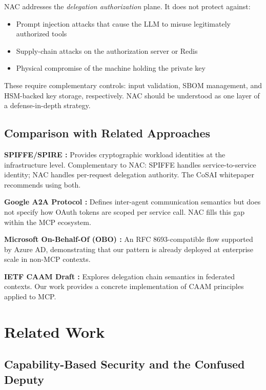 \documentclass[journal]{IEEEtran}
\begin{document}
NAC addresses the \textit{delegation authorization} plane. It does not protect against:
\begin{itemize}
  \item Prompt injection attacks that cause the LLM to misuse legitimately authorized tools
  \item Supply-chain attacks on the authorization server or Redis
  \item Physical compromise of the machine holding the private key
\end{itemize}

These require complementary controls: input validation, SBOM management, and HSM-backed key storage, respectively. NAC should be understood as one layer of a defense-in-depth strategy.

\subsection{Comparison with Related Approaches}

\textbf{SPIFFE/SPIRE \cite{spiffe}:} Provides cryptographic workload identities at the infrastructure level. Complementary to NAC: SPIFFE handles service-to-service identity; NAC handles per-request delegation authority. The CoSAI whitepaper \cite{cosai_mcp} recommends using both.

\textbf{Google A2A Protocol \cite{google_a2a}:} Defines inter-agent communication semantics but does not specify how OAuth tokens are scoped per service call. NAC fills this gap within the MCP ecosystem.

\textbf{Microsoft On-Behalf-Of (OBO) \cite{msal}:} An RFC 8693-compatible flow supported by Azure AD, demonstrating that our pattern is already deployed at enterprise scale in non-MCP contexts.

\textbf{IETF CAAM Draft \cite{ietf_caam}:} Explores delegation chain semantics in federated contexts. Our work provides a concrete implementation of CAAM principles applied to MCP.


\section{Related Work}
\label{sec:related}

\subsection{Capability-Based Security and the Confused Deputy}
\end{document}
